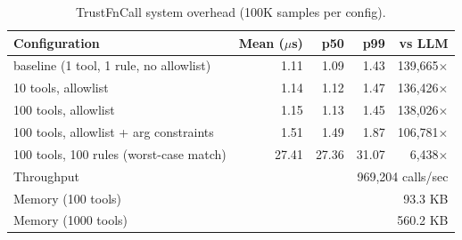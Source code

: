 \begin{table}[t]
\centering
\caption{TrustFnCall system overhead (100K samples per config).}
\label{tab:system}
\small
\begin{tabular}{lrrrr}
\toprule
\textbf{Configuration} & \textbf{Mean ($\mu$s)} & \textbf{p50} & \textbf{p99} & \textbf{vs LLM} \\
\midrule
  baseline (1 tool, 1 rule, no allowlist) & 1.11 & 1.09 & 1.43 & 139,665$\times$ \\
  10 tools, allowlist & 1.14 & 1.12 & 1.47 & 136,426$\times$ \\
  100 tools, allowlist & 1.15 & 1.13 & 1.45 & 138,026$\times$ \\
  100 tools, allowlist + arg constraints & 1.51 & 1.49 & 1.87 & 106,781$\times$ \\
  100 tools, 100 rules (worst-case match) & 27.41 & 27.36 & 31.07 & 6,438$\times$ \\
\midrule
  Throughput & \multicolumn{4}{r}{969,204 calls/sec} \\
  Memory (100 tools) & \multicolumn{4}{r}{93.3 KB} \\
  Memory (1000 tools) & \multicolumn{4}{r}{560.2 KB} \\
\bottomrule
\end{tabular}
\end{table}